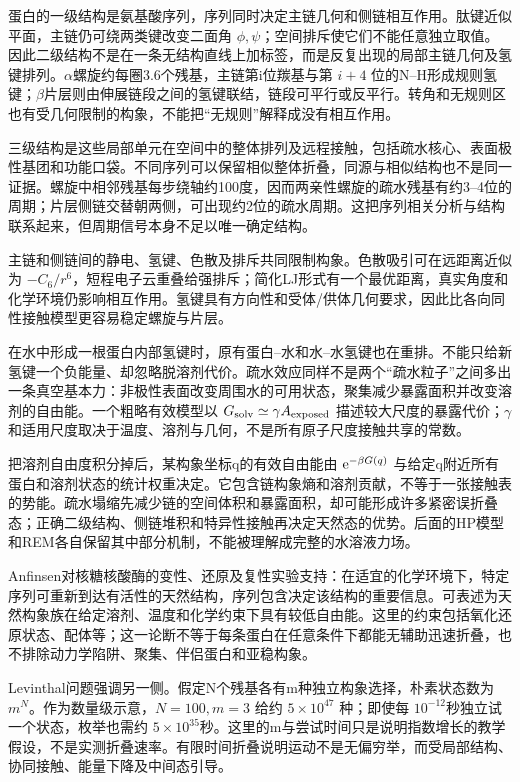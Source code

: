 
蛋白的一级结构是氨基酸序列，序列同时决定主链几何和侧链相互作用。肽键近似平面，主链仍可绕两类键改变二面角 $\phi,\psi$；空间排斥使它们不能任意独立取值。因此二级结构不是在一条无结构直线上加标签，而是反复出现的局部主链几何及氢键排列。$\alpha$螺旋约每圈3.6个残基，主链第i位羰基与第 $i+4$ 位的N--H形成规则氢键；$\beta$片层则由伸展链段之间的氢键联结，链段可平行或反平行。转角和无规则区也有受几何限制的构象，不能把“无规则”解释成没有相互作用。

三级结构是这些局部单元在空间中的整体排列及远程接触，包括疏水核心、表面极性基团和功能口袋。不同序列可以保留相似整体折叠，同源与相似结构也不是同一证据。螺旋中相邻残基每步绕轴约100度，因而两亲性螺旋的疏水残基有约3--4位的周期；片层侧链交替朝两侧，可出现约2位的疏水周期。这把序列相关分析与结构联系起来，但周期信号本身不足以唯一确定结构。

主链和侧链间的静电、氢键、色散及排斥共同限制构象。色散吸引可在远距离近似为 $-C_6/r^6$，短程电子云重叠给强排斥；简化LJ形式有一个最优距离，真实角度和化学环境仍影响相互作用。氢键具有方向性和受体/供体几何要求，因此比各向同性接触模型更容易稳定螺旋与片层。

在水中形成一根蛋白内部氢键时，原有蛋白--水和水--水氢键也在重排。不能只给新氢键一个负能量、却忽略脱溶剂代价。疏水效应同样不是两个“疏水粒子”之间多出一条真空基本力：非极性表面改变周围水的可用状态，聚集减少暴露面积并改变溶剂的自由能。一个粗略有效模型以 $G_{\rm solv}\simeq\gamma A_{\rm exposed}$ 描述较大尺度的暴露代价；$\gamma$和适用尺度取决于温度、溶剂与几何，不是所有原子尺度接触共享的常数。

把溶剂自由度积分掉后，某构象坐标q的有效自由能由 $\mathrm e^{-\beta G(q)}$ 与给定q附近所有蛋白和溶剂状态的统计权重决定。它包含链构象熵和溶剂贡献，不等于一张接触表的势能。疏水塌缩先减少链的空间体积和暴露面积，却可能形成许多紧密误折叠态；正确二级结构、侧链堆积和特异性接触再决定天然态的优势。后面的HP模型和REM各自保留其中部分机制，不能被理解成完整的水溶液力场。

Anfinsen对核糖核酸酶的变性、还原及复性实验支持：在适宜的化学环境下，特定序列可重新到达有活性的天然结构，序列包含决定该结构的重要信息。可表述为天然构象族在给定溶剂、温度和化学约束下具有较低自由能。这里的约束包括氧化还原状态、配体等；这一论断不等于每条蛋白在任意条件下都能无辅助迅速折叠，也不排除动力学陷阱、聚集、伴侣蛋白和亚稳构象。

Levinthal问题强调另一侧。假定N个残基各有m种独立构象选择，朴素状态数为 $m^N$。作为数量级示意，$N=100,m=3$ 给约 $5\times10^{47}$ 种；即使每 $10^{-12}$秒独立试一个状态，枚举也需约 $5\times10^{35}$秒。这里的m与尝试时间只是说明指数增长的教学假设，不是实测折叠速率。有限时间折叠说明运动不是无偏穷举，而受局部结构、协同接触、能量下降及中间态引导。

